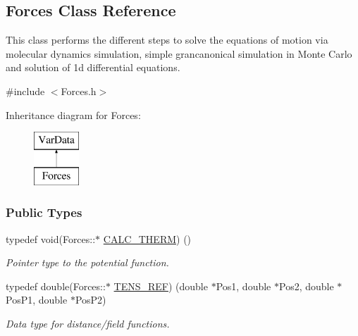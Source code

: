 \hypertarget{classForces}{}\subsection{Forces Class Reference}
\label{classForces}


This class performs the different steps to solve the equations of motion via molecular dynamics simulation, simple grancanonical simulation in Monte Carlo and solution of 1d differential equations.  




{\ttfamily \#include $<$Forces.\+h$>$}

Inheritance diagram for Forces\+:\begin{figure}[H]
\begin{center}
\leavevmode
\includegraphics[height=2.000000cm]{classForces}
\end{center}
\end{figure}
\subsubsection*{Public Types}
\begin{DoxyCompactItemize}
\item 
typedef void(Forces\+::$\ast$ \hyperlink{classForces_a287767d0d121df9d18211f05b84b692d}{C\+A\+L\+C\+\_\+\+T\+H\+E\+RM}) ()\hypertarget{classForces_a287767d0d121df9d18211f05b84b692d}{}\label{classForces_a287767d0d121df9d18211f05b84b692d}

\begin{DoxyCompactList}\small\item\em Pointer type to the potential function. \end{DoxyCompactList}\item 
typedef double(Forces\+::$\ast$ \hyperlink{classForces_a6a793e08866e28de487e8de0b0dd6cb6}{T\+E\+N\+S\+\_\+\+R\+EF}) (double $\ast$Pos1, double $\ast$Pos2, double $\ast$Pos\+P1, double $\ast$Pos\+P2)\hypertarget{classForces_a6a793e08866e28de487e8de0b0dd6cb6}{}\label{classForces_a6a793e08866e28de487e8de0b0dd6cb6}

\begin{DoxyCompactList}\small\item\em Data type for distance/field functions. \end{DoxyCompactList}\end{DoxyCompactItemize}
